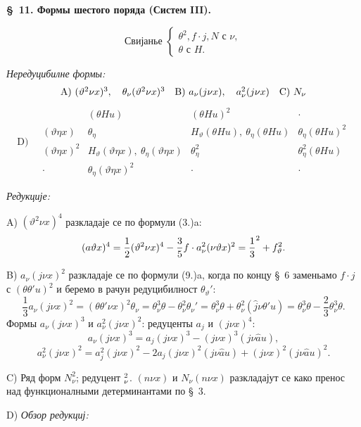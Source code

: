 ﻿\documentclass[11pt]{article}
\let\A\relax
\newcommand{\A}{\mathfrak A}
\begin{document}
\begin{center}
\textbf{\S\ 11. \quad Формы шестого поряда (Систем III).}
\end{center}
\[
\text{Свијанье }\left\{\begin{array}{l}
\theta^2,
 f\cdot j,
 N \text{ с }\nu,\\
\theta\text{ с }H.
\end{array}\right.
\]

\noindent\textit{Нередуцибилне формы:}
\[
\begin{array}{c@{\quad}c@{\quad}c}
\mathrm{A)}\ (\vartheta^2\nu x)^3,\quad \theta_\nu(\vartheta^2\nu x)^3
&
\mathrm{B)}\ a_\nu(j\nu x),\quad a_\nu^2(j\nu x)
&
\mathrm{C)}\ N_\nu
\end{array}
\]
\[
\mathrm{D)}\quad
\begin{array}{c|c|c|c}
 & (\theta Hu)&(\theta Hu)^2&\cdot\\
(\vartheta\eta x)&\theta_\eta&H_\vartheta(\theta Hu),\ \theta_\eta(\theta Hu)&\theta_\eta(\theta Hu)^2\\
(\vartheta\eta x)^2&H_\vartheta(\vartheta\eta x),\ \theta_\eta(\vartheta\eta x)&\theta_\eta^2&\theta_\eta^2(\theta Hu)\\
\cdot&\theta_\eta(\vartheta\eta x)^2&\cdot&\cdot
\end{array}
\]

\noindent\textit{Редукције:}

\noindent\mbox{A)} $(\vartheta^2\nu x)^4$ разкладаје се по формули (3.)\mbox{a}:
\[
(a\A\vartheta x)^4=\frac12(\vartheta^2\nu x)^4-\frac35 f\cdot a_\nu^2(\nu\vartheta x)^2
=\frac13\A^2+f\A_\vartheta^2.
\]

\noindent\mbox{B)} $a_\nu(j\nu x)^2$ разкладаје се по формули (9.)\mbox{a}, когда по концу \S\ 6 заменьамо $f\cdot j$ с $(\theta\theta'u)^2$ и беремо в рачун редуцибилност $\theta_\vartheta'$:
\[
\frac13a_\nu(j\nu x)^2=(\theta\theta'\nu x)^2\theta_\nu
=\theta_\nu^3\theta-\theta_\nu^2\theta_\nu'
=\theta_\nu^3\theta+\theta_\nu^2(\widehat{j}\nu\theta'u)
=\theta_\nu^3\theta-\frac23\theta_\nu^3\theta.
\]
Формы $a_\nu(j\nu x)^3$ и $a_\nu^2(j\nu x)^2$: редуценты $a_j$ и $(j\nu x)^4$:
\[
a_\nu(j\nu x)^3=a_j(j\nu x)^3-(j\nu x)^3(j\nu\widehat{a}u),
\]
\[
a_\nu^2(j\nu x)^2=a_j^2(j\nu x)^2-2a_j(j\nu x)^2(j\nu\widehat{a}u)+(j\nu x)^2(j\nu\widehat{a}u)^2.
\]

\noindent\mbox{C)} Ряд форм $N_\nu^2$; редуцент $\A_\nu^2$. $(n\nu x)$ и $N_\nu(n\nu x)$ разкладајут се како пренос над функционалными детерминантами по \S\ 3.

\noindent\mbox{D)} \textit{Обзор редукциј:}
\end{document}
